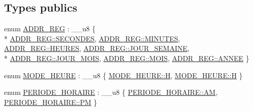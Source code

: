 \subsection*{Types publics}
\begin{DoxyCompactItemize}
\item 
enum \hyperlink{classCRTC_adf700236f14a2071204dc36a75cf4890}{A\+D\+D\+R\+\_\+\+R\+E\+G} \+: \+\_\+\+\_\+u8 \{ \\*
\hyperlink{classCRTC_adf700236f14a2071204dc36a75cf4890af6254ea2451edcc790ea94601f21f927}{A\+D\+D\+R\+\_\+\+R\+E\+G\+::\+S\+E\+C\+O\+N\+D\+E\+S}, 
\hyperlink{classCRTC_adf700236f14a2071204dc36a75cf4890a7ffb9cea885bcba59e55574d54f819c2}{A\+D\+D\+R\+\_\+\+R\+E\+G\+::\+M\+I\+N\+U\+T\+E\+S}, 
\hyperlink{classCRTC_adf700236f14a2071204dc36a75cf4890aca61b64a779fac8c730cfd702fed7a6d}{A\+D\+D\+R\+\_\+\+R\+E\+G\+::\+H\+E\+U\+R\+E\+S}, 
\hyperlink{classCRTC_adf700236f14a2071204dc36a75cf4890a1dd4d26d677c6f4002e7aa611271afcc}{A\+D\+D\+R\+\_\+\+R\+E\+G\+::\+J\+O\+U\+R\+\_\+\+S\+E\+M\+A\+I\+N\+E}, 
\\*
\hyperlink{classCRTC_adf700236f14a2071204dc36a75cf4890a73bbdad552b84783db05ceb17028668b}{A\+D\+D\+R\+\_\+\+R\+E\+G\+::\+J\+O\+U\+R\+\_\+\+M\+O\+I\+S}, 
\hyperlink{classCRTC_adf700236f14a2071204dc36a75cf4890a2256ab3ce73e9b0ee693d8c78cefe7a1}{A\+D\+D\+R\+\_\+\+R\+E\+G\+::\+M\+O\+I\+S}, 
\hyperlink{classCRTC_adf700236f14a2071204dc36a75cf4890a183bf954a3bf4d6fef2515152358aca8}{A\+D\+D\+R\+\_\+\+R\+E\+G\+::\+A\+N\+N\+E\+E}
 \}
\item 
enum \hyperlink{classCRTC_a5b756d38b71f30430a0d4dee80c935a2}{M\+O\+D\+E\+\_\+\+H\+E\+U\+R\+E} \+: \+\_\+\+\_\+u8 \{ \hyperlink{classCRTC_a5b756d38b71f30430a0d4dee80c935a2ac1d9f50f86825a1a2302ec2449c17196}{M\+O\+D\+E\+\_\+\+H\+E\+U\+R\+E\+::\+H}, 
\hyperlink{classCRTC_a5b756d38b71f30430a0d4dee80c935a2ac1d9f50f86825a1a2302ec2449c17196}{M\+O\+D\+E\+\_\+\+H\+E\+U\+R\+E\+::\+H}
 \}
\item 
enum \hyperlink{classCRTC_a7b63c946c21b9e27296d5799c7a96781}{P\+E\+R\+I\+O\+D\+E\+\_\+\+H\+O\+R\+A\+I\+R\+E} \+: \+\_\+\+\_\+u8 \{ \hyperlink{classCRTC_a7b63c946c21b9e27296d5799c7a96781a25ec916d56b8212e569dbf2e4e4b51d4}{P\+E\+R\+I\+O\+D\+E\+\_\+\+H\+O\+R\+A\+I\+R\+E\+::\+A\+M}, 
\hyperlink{classCRTC_a7b63c946c21b9e27296d5799c7a96781a21b7eb30013b04776f5b06bc59209391}{P\+E\+R\+I\+O\+D\+E\+\_\+\+H\+O\+R\+A\+I\+R\+E\+::\+P\+M}
 \}
\end{DoxyCompactItemize}
